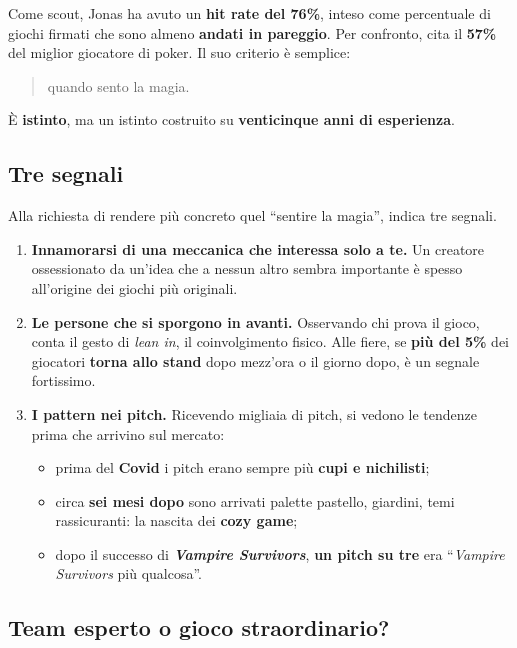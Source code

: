 Come scout, Jonas ha avuto un \textbf{hit rate del 76\%}, inteso come percentuale
di giochi firmati che sono almeno \textbf{andati in pareggio}. Per confronto, cita
il \textbf{57\%} del miglior giocatore di poker. Il suo criterio è semplice:
\begin{quote}
quando sento la magia.
\end{quote}
È \textbf{istinto}, ma un istinto costruito su \textbf{venticinque anni di
esperienza}.

\subsection{Tre segnali}

Alla richiesta di rendere più concreto quel ``sentire la magia'', indica tre
segnali.
\begin{enumerate}
  \item \textbf{Innamorarsi di una meccanica che interessa solo a te.} Un
        creatore ossessionato da un'idea che a nessun altro sembra importante è
        spesso all'origine dei giochi più originali.
  \item \textbf{Le persone che si sporgono in avanti.} Osservando chi prova il
        gioco, conta il gesto di \emph{lean in}, il coinvolgimento fisico. Alle
        fiere, se \textbf{più del 5\%} dei giocatori \textbf{torna allo stand}
        dopo mezz'ora o il giorno dopo, è un segnale fortissimo.
  \item \textbf{I pattern nei pitch.} Ricevendo migliaia di pitch, si vedono le
        tendenze prima che arrivino sul mercato:
        \begin{itemize}
          \item prima del \textbf{Covid} i pitch erano sempre più
                \textbf{cupi e nichilisti};
          \item circa \textbf{sei mesi dopo} sono arrivati palette pastello,
                giardini, temi rassicuranti: la nascita dei \textbf{cozy game};
          \item dopo il successo di \textbf{\emph{Vampire Survivors}}, \textbf{un
                pitch su tre} era ``\emph{Vampire Survivors} più qualcosa''.
        \end{itemize}
\end{enumerate}

\subsection{Team esperto o gioco straordinario?}

